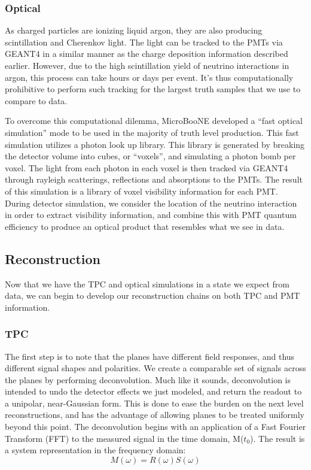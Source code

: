 \subsubsection{Optical}
As charged particles are ionizing liquid argon, they are also producing scintillation and Cherenkov light. The light can be  tracked to the PMTs via GEANT4 in a similar manner as the charge deposition information described earlier. However, due to the high scintillation yield of neutrino interactions in argon, this process can take hours or days per event. It's thus computationally prohibitive to perform such tracking for the largest truth samples that we use to compare to data.  
\par To overcome this computational dilemma, MicroBooNE developed a “fast optical simulation” mode to be used in the majority of truth level production.  This fast simulation utilizes a photon look up library. This library is generated by breaking the detector volume into cubes, or ``voxels'', and simulating a photon bomb per voxel.  The light from each photon in each voxel is then tracked via GEANT4 through rayleigh scatterings, reflections and absorptions to the PMTs. The result of this simulation is a library of voxel visibility information for each PMT.  During detector simulation, we consider the location of the neutrino interaction in order to extract visibility information, and combine this with PMT quantum efficiency to produce an optical product that resembles what we see in data.  
 
\subsection{Reconstruction}
Now that we have the TPC and optical simulations in a state we expect from data, we can begin to develop our reconstruction chains on both TPC and PMT information. 
\subsubsection{TPC}
 The first step is to note that the planes have different field responses, and thus different signal shapes and polarities.  We create a comparable set of signals across the planes by performing deconvolution.  Much like it sounds, deconvolution is intended to undo the detector effects we just modeled, and return the readout to a unipolar, near-Gaussian form. This is done to ease the burden on the next level reconstructions, and has the advantage of allowing planes to be treated uniformly beyond this point. The deconvolution begins with an application of a Fast Fourier Transform (FFT) to the measured signal in the time domain, M($t_0$). The result is a system representation in the frequency domain:
\begin{equation}
M(\omega) = R(\omega)S(\omega) 
\end{equation}

